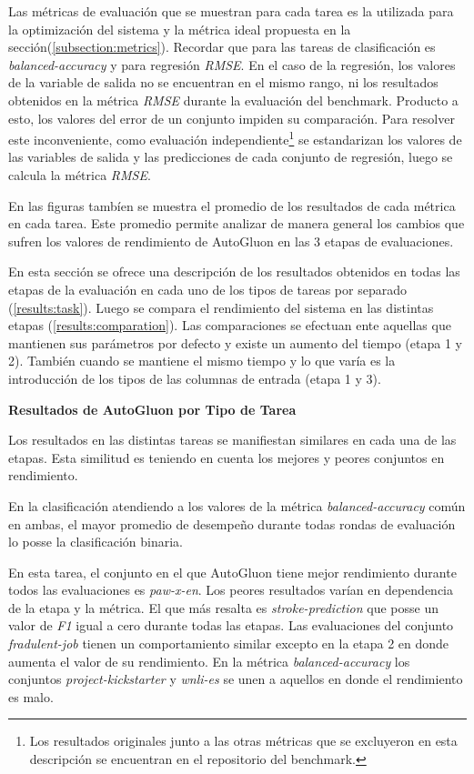 Las métricas de evaluación que se muestran para cada tarea es la utilizada para la optimización del sistema y la métrica ideal propuesta en la 
sección(\ref{subsection:metrics}). Recordar que para las tareas de clasificación es \textit{balanced-accuracy} y para regresión \textit{RMSE}.
En el caso de la regresión, los valores de la variable de salida no se encuentran en el mismo rango, ni los resultados obtenidos en la métrica \textit{RMSE} 
durante la evaluación del benchmark. Producto a esto, los valores del error de un conjunto impiden su comparación. Para resolver este inconveniente,
como evaluación independiente\footnote{Los resultados originales junto a las otras métricas que se excluyeron en esta descripción se encuentran en el repositorio del 
benchmark.} se estandarizan los valores de las variables de salida y las predicciones de cada conjunto de regresión, luego se calcula la métrica 
\textit{RMSE}.

En las figuras tambíen se muestra el promedio de los resultados de cada métrica en cada tarea. Este promedio permite analizar de manera general los cambios que 
sufren los valores de rendimiento de AutoGluon en las 3 etapas de evaluaciones.

En esta sección se ofrece una descripción de los resultados obtenidos en todas las etapas de la evaluación en cada uno de los tipos de tareas por 
separado (\ref{results:task}). 
Luego se compara el rendimiento del sistema en las distintas etapas (\ref{results:comparation}). Las comparaciones se efectuan ente aquellas que 
mantienen sus parámetros por defecto y existe un aumento del tiempo (etapa 1 y 2). 
También cuando se mantiene el mismo tiempo y lo que varía es la introducción de los tipos de las columnas de entrada (etapa 1 y 3).


\begin{flushleft} 
  {\large { \textbf{Resultados de AutoGluon por Tipo de Tarea}}}\label{results:task}
\end{flushleft}
Los resultados en las distintas tareas se manifiestan similares en cada una de las etapas. Esta similitud es teniendo en cuenta los mejores y peores conjuntos en 
rendimiento.

En la clasificación atendiendo a los valores de la métrica \textit{balanced-accuracy} común en ambas, el mayor promedio de desempeño durante todas rondas de evaluación 
lo posse la clasificación binaria.

En esta tarea, el conjunto en el que AutoGluon tiene mejor rendimiento durante todos las evaluaciones es \textit{paw-x-en}. Los peores resultados varían en dependencia de la etapa y la 
métrica. El que más resalta es \textit{stroke-prediction} que posse un valor de \textit{F1} igual a cero durante todas las etapas. Las evaluaciones del conjunto 
\textit{fradulent-job} tienen un comportamiento similar excepto en la etapa 2 en donde aumenta el valor de su rendimiento. En la métrica \textit{balanced-accuracy} 
los conjuntos \textit{project-kickstarter} y \textit{wnli-es} se unen a aquellos en donde el rendimiento es malo.

